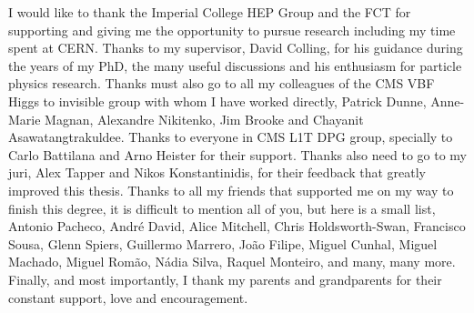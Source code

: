 
\begin{acknowledgements}
I would like to thank the Imperial College HEP Group and the FCT for supporting and giving me the opportunity to pursue research including my time spent at CERN. Thanks to my supervisor, David Colling, for his guidance during the years of my PhD, the many useful discussions and his enthusiasm for particle physics research. Thanks must also go to all my colleagues of the CMS VBF Higgs to invisible group with whom I have worked directly, Patrick Dunne, Anne-Marie Magnan, Alexandre Nikitenko, Jim Brooke and Chayanit Asawatangtrakuldee. Thanks to everyone in CMS L1T DPG group, specially to Carlo Battilana and Arno Heister for their support. Thanks also need to go to my juri, Alex Tapper and Nikos Konstantinidis, for their feedback that greatly improved this thesis. Thanks to all my friends that supported me on my way to finish this degree, it is difficult to mention all of you, but here is a small list, Antonio Pacheco, André David, Alice Mitchell, Chris Holdsworth-Swan, Francisco Sousa, Glenn Spiers, Guillermo Marrero, João Filipe, Miguel Cunhal, Miguel Machado, Miguel Romão, Nádia Silva, Raquel Monteiro, and many, many more. Finally, and most importantly, I thank my parents and grandparents for their constant support, love and encouragement.
\end{acknowledgements}




\dedication{To my grandmother.}


\tableofcontents

\newpage
\listoftables

\newpage
\listoffigures


 
